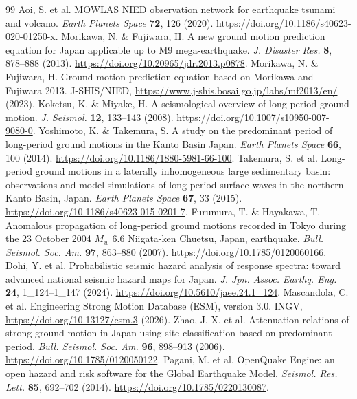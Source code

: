 \begin{thebibliography}{99}
 Aoi, S. et al. MOWLAS NIED observation network for earthquake tsunami and volcano. \textit{Earth Planets Space} \textbf{72}, 126 (2020). \url{https://doi.org/10.1186/s40623-020-01250-x}.
 Morikawa, N. \& Fujiwara, H. A new ground motion prediction equation for Japan applicable up to M9 mega-earthquake. \textit{J. Disaster Res.} \textbf{8}, 878--888 (2013). \url{https://doi.org/10.20965/jdr.2013.p0878}.
 Morikawa, N. \& Fujiwara, H. Ground motion prediction equation based on Morikawa and Fujiwara 2013. J-SHIS/NIED, \url{https://www.j-shis.bosai.go.jp/labs/mf2013/en/} (2023).
 Koketsu, K. \& Miyake, H. A seismological overview of long-period ground motion. \textit{J. Seismol.} \textbf{12}, 133--143 (2008). \url{https://doi.org/10.1007/s10950-007-9080-0}.
 Yoshimoto, K. \& Takemura, S. A study on the predominant period of long-period ground motions in the Kanto Basin Japan. \textit{Earth Planets Space} \textbf{66}, 100 (2014). \url{https://doi.org/10.1186/1880-5981-66-100}.
 Takemura, S. et al. Long-period ground motions in a laterally inhomogeneous large sedimentary basin: observations and model simulations of long-period surface waves in the northern Kanto Basin, Japan. \textit{Earth Planets Space} \textbf{67}, 33 (2015). \url{https://doi.org/10.1186/s40623-015-0201-7}.
 Furumura, T. \& Hayakawa, T. Anomalous propagation of long-period ground motions recorded in Tokyo during the 23 October 2004 $M_w$ 6.6 Niigata-ken Chuetsu, Japan, earthquake. \textit{Bull. Seismol. Soc. Am.} \textbf{97}, 863--880 (2007). \url{https://doi.org/10.1785/0120060166}.
 Dohi, Y. et al. Probabilistic seismic hazard analysis of response spectra: toward advanced national seismic hazard maps for Japan. \textit{J. Jpn. Assoc. Earthq. Eng.} \textbf{24}, 1\_124--1\_147 (2024). \url{https://doi.org/10.5610/jaee.24.1_124}.
 Mascandola, C. et al. Engineering Strong Motion Database (ESM), version 3.0. INGV, \url{https://doi.org/10.13127/esm.3} (2026).
 Zhao, J. X. et al. Attenuation relations of strong ground motion in Japan using site classification based on predominant period. \textit{Bull. Seismol. Soc. Am.} \textbf{96}, 898--913 (2006). \url{https://doi.org/10.1785/0120050122}.
 Pagani, M. et al. OpenQuake Engine: an open hazard and risk software for the Global Earthquake Model. \textit{Seismol. Res. Lett.} \textbf{85}, 692--702 (2014). \url{https://doi.org/10.1785/0220130087}.

\end{thebibliography}
